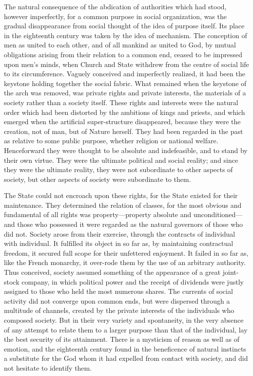 \documentclass{book}
\begin{document}
The natural consequence of the abdication of authorities which had stood, however imperfectly, for a common purpose in social organization, was the gradual disappearance from social thought of the idea of purpose itself. Its place in the eighteenth century was taken by the idea of mechanism. The conception of men as united to each other, and of all mankind as united to God, by mutual obligations arising from their relation to a common end, ceased to be impressed upon men’s minds, when Church and State withdrew from the centre of social life to its circumference. Vaguely conceived and imperfectly realized, it had been the keystone holding together the social fabric. What remained when the keystone of the arch was removed, was private rights and private interests, the materials of a society rather than a society itself. These rights and interests were the natural order which had been distorted by the ambitions of kings and priests, and which emerged when the artificial super-structure disappeared, because they were the creation, not of man, but of Nature herself. They had been regarded in the past as relative to some public purpose, whether religion or national welfare. Henceforward they were thought to be absolute and indefeasible, and to stand by their own virtue. They were the ultimate political and social reality; and since they were the ultimate reality, they were not subordinate to other aspects of society, but other aspects of society were subordinate to them.

The State could not encroach upon these rights, for the State existed for their maintenance. They determined the relation of classes, for the most obvious and fundamental of all rights was property—property absolute and unconditioned—and those who possessed it were regarded as the natural governors of those who did not. Society arose from their exercise, through the contracts of individual with individual. It fulfilled its object in so far as, by maintaining contractual freedom, it secured full scope for their unfettered enjoyment. It failed in so far as, like the French monarchy, it over-rode them by the use of an arbitrary authority. Thus conceived, society assumed something of the appearance of a great joint-stock company, in which political power and the receipt of dividends were justly assigned to those who held the most numerous shares. The currents of social activity did not converge upon common ends, but were dispersed through a multitude of channels, created by the private interests of the individuals who composed society. But in their very variety and spontaneity, in the very absence of any attempt to relate them to a larger purpose than that of the individual, lay the best security of its attainment. There is a mysticism of reason as well as of emotion, and the eighteenth century found in the beneficence of natural instincts a substitute for the God whom it had expelled from contact with society, and did not hesitate to identify them.
\end{document}

